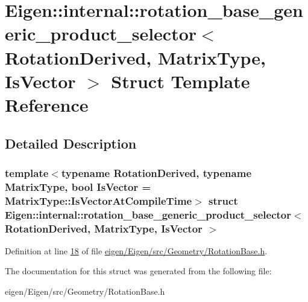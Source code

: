 \hypertarget{struct_eigen_1_1internal_1_1rotation__base__generic__product__selector}{}\section{Eigen\+:\+:internal\+:\+:rotation\+\_\+base\+\_\+generic\+\_\+product\+\_\+selector$<$ Rotation\+Derived, Matrix\+Type, Is\+Vector $>$ Struct Template Reference}
\label{struct_eigen_1_1internal_1_1rotation__base__generic__product__selector}


\subsection{Detailed Description}
\subsubsection*{template$<$typename Rotation\+Derived, typename Matrix\+Type, bool Is\+Vector = Matrix\+Type\+::\+Is\+Vector\+At\+Compile\+Time$>$\newline
struct Eigen\+::internal\+::rotation\+\_\+base\+\_\+generic\+\_\+product\+\_\+selector$<$ Rotation\+Derived, Matrix\+Type, Is\+Vector $>$}



Definition at line \hyperlink{eigen_2_eigen_2src_2_geometry_2_rotation_base_8h_source_l00018}{18} of file \hyperlink{eigen_2_eigen_2src_2_geometry_2_rotation_base_8h_source}{eigen/\+Eigen/src/\+Geometry/\+Rotation\+Base.\+h}.



The documentation for this struct was generated from the following file\+:\begin{DoxyCompactItemize}
\item 
eigen/\+Eigen/src/\+Geometry/\+Rotation\+Base.\+h\end{DoxyCompactItemize}
